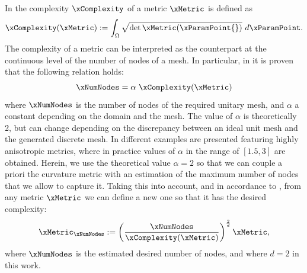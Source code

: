 \documentclass[1p]{elsarticle}
\begin{document}
In \cite{loseille2011continuous1,loseille2011continuous2} the complexity $\xComplexity$ of a metric $\xMetric$ is defined as 
\begin{equation}
\label{eq:complexity}
\xComplexity(\xMetric) :=\int_{\Omega}\sqrt{ \det \xMetric(\xParamPoint{}) } \ d\xParamPoint.
\end{equation}
The complexity of a metric 
can be interpreted as the counterpart at the continuous level of the number of nodes of a mesh. In particular, in \cite{loseille2011continuous1} it is proven that the following relation holds:
\begin{equation}
\label{eq:nodesComplexity}
\xNumNodes = \alpha\ \xComplexity(\xMetric)
\end{equation}
where $\xNumNodes$ is the number of nodes of the required unitary mesh, and $\alpha$ a constant depending on the domain and the mesh. The value of $\alpha$ is theoretically 2, but can change depending on the discrepancy between an ideal unit mesh and the generated discrete mesh. 
In \cite{loseille2011continuous2} different examples are presented featuring highly anisotropic metrics, where in practice values of $\alpha$ in the range of $[1.5,3]$ are obtained. Herein, %
 we use the theoretical value $\alpha=2$ so that we can couple a priori the curvature metric with an estimation of the maximum number of nodes that we allow to capture it.
Taking this into account, and in accordance to \cite{loseille2011continuous1}, from any metric $\xMetric$ we can define a new one so that it has the desired complexity:
\begin{equation}
\label{eq:metric_complexity}
\xMetric_{\xNumNodes}:=\left( \frac{\xNumNodes}{\xComplexity(\xMetric)} \right)^{\frac{2}{d}} \xMetric,
\end{equation}
where $\xNumNodes$ is the estimated desired number of nodes, and where $d=2$ in this work.
\end{document}
